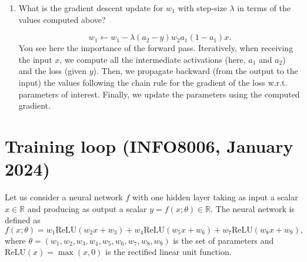 \documentclass[11pt, a4paper]{article}
\begin{document}
\begin{enumerate}
    \item What is the gradient descent update for $w_1$ with step-size $\lambda$ in terms of the values computed above?

    \begin{solution}
        $$
        w_1 \leftarrow w_1 - \lambda (a_2 - y)w_2 a_1(1-a_1)x.
        $$
        You see here the importance of the forward pass. Iteratively, when receiving the input $x$, we compute all the intermediate activations (here, $a_1$ and $a_2$) and the loss (given $y$). Then, we propagate backward (from the output to the input) the values following the chain rule for the gradient of the loss w.r.t. parameters of interest. Finally, we update the parameters using the computed gradient.
    \end{solution}
\end{enumerate}
\newpage


\section{Training loop (INFO8006, January 2024)}
Let us consider a neural network $f$ with one hidden layer taking as input a scalar $x \in \mathbb{R}$ and producing as output a scalar $y=f(x;\theta) \in \mathbb{R}$. The neural network is defined as $$f(x; \theta) = w_1 \text{ReLU}(w_2 x + w_3) + w_4 \text{ReLU}(w_5 x + w_6) + w_7 \text{ReLU}(w_8 x + w_9),$$ where $\theta = (w_1, w_2, w_3, w_4, w_5, w_6, w_7, w_8, w_9)$ is the set of parameters and $\text{ReLU}(x) = \max(x, 0)$ is the rectified linear unit function.
\end{document}
